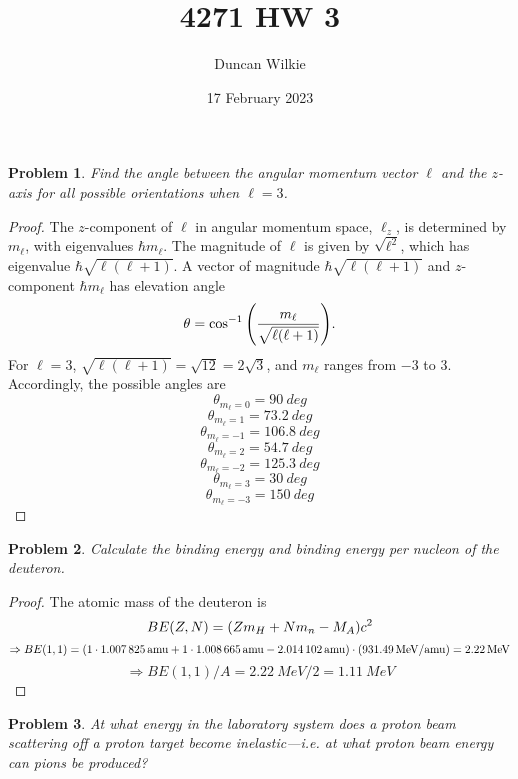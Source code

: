 \documentclass{article}
\title{4271 HW 3}
\author{Duncan Wilkie}
\date{17 February 2023}
\newtheorem{plm}{Problem}
\begin{document}
\maketitle

\begin{plm}
  Find the angle between the angular momentum vector $\ell$ and the $z$-axis for all possible orientations when $\ell = 3$.
\end{plm}

\begin{proof}
  The $z$-component of $\ell$ in angular momentum space, $\ell_{z}$, is determined by $m_{\ell}$, with eigenvalues $\hbar m_{\ell}$.
  The magnitude of $\ell$ is given by $\sqrt{\ell^{2}}$, which has eigenvalue $\hbar\sqrt{\ell(\ell + 1)}$.
  A vector of magnitude $\hbar\sqrt{\ell(\ell + 1)}$ and $z$-component $\hbar m_{\ell}$ has elevation angle
  \[
    \theta = \cos^{-1}\qty(\frac{m_{\ell}}{\sqrt{\ell(\ell + 1)}}).
  \]
  For $\ell = 3$, $\sqrt{\ell(\ell + 1)} = \sqrt{12} = 2\sqrt{3}$, and $m_{\ell}$ ranges from $-3$ to $3$.
  Accordingly, the possible angles are
  \[
    \theta_{m_{\ell} = 0} = \SI{90}{deg}
  \]
  \[
    \theta_{m_{\ell} = 1} = \SI{73.2}{deg}
  \]
  \[
    \theta_{m_{\ell} = -1} = \SI{106.8}{deg}
  \]
  \[
    \theta_{m_{\ell} = 2} = \SI{54.7}{deg}
  \]
  \[
    \theta_{m_{\ell} = -2} = \SI{125.3}{deg}
  \]
  \[
    \theta_{m_{\ell} = 3} = \SI{30}{deg}
  \]
  \[
    \theta_{m_{\ell} = -3} = \SI{150}{deg}
  \]
\end{proof}

\begin{plm}
  Calculate the binding energy and binding energy per nucleon of the deuteron.
\end{plm}

\begin{proof}
  The atomic mass of the deuteron is
  \[
    BE(Z, N) = \qty(Zm_{H} + Nm_{n} - M_{A})c^{2}
  \]
  \[
    \Rightarrow BE(1, 1) = \qty(1 \cdot \SI{1.007825}{amu} + 1 \cdot \SI{1.008665}{amu} - \SI{2.014102}{amu}) \cdot (\SI{931.49}{MeV/amu})
    = \SI{2.22}{MeV}
  \]
  \[
    \Rightarrow BE(1,1)/A = \SI{2.22}{MeV} / 2 = \SI{1.11}{MeV}
  \]
\end{proof}

\begin{plm}
  At what energy in the laboratory system does a proton beam scattering off a proton target become inelastic---i.e.
  at what proton beam energy can pions be produced?
\end{plm}
\end{document}
